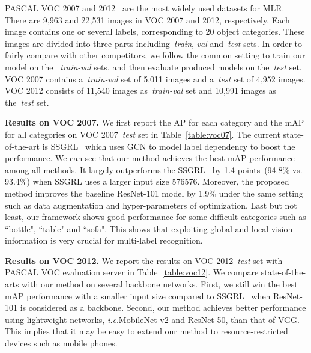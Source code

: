 \documentclass[journal]{IEEEtran}
\makeatletter
\DeclareRobustCommand\onedot{\@onedot}
\def\@onedot{.}
\def\ie{\emph{i.e}\onedot}
\makeatother
\begin{document}
PASCAL VOC 2007 and 2012~\cite{everingham2010pascal} are the most widely used datasets for MLR. There are 9,963 and 22,531 images in  VOC 2007 and 2012, respectively. Each image contains one or several labels, corresponding to 20 object categories. These images are divided into three parts including~\emph{train}, \emph{val} and~\emph{test} sets. In order to fairly compare with other competitors, we follow the common setting to train our model on the~
\emph{train-val} sets, and then evaluate produced models on the~\emph{test} set. VOC 2007 contains a~\emph{train-val} set of 5,011 images and a~\emph{test} set of 4,952 images. VOC 2012 consists of 11,540 images as~\emph{train-val} set and 10,991 images as the~\emph{test} set.

\noindent \textbf{Results on VOC 2007.}
We first report the AP for each category and the mAP for all categories on VOC 2007~\emph{test} set in Table~\ref{table:voc07}. The current state-of-the-art is SSGRL~\cite{chenlearning} which uses GCN to model label dependency to boost the performance. We can see that our method achieves the best mAP performance among all methods. 
It largely outperforms the SSGRL~\cite{chen2019multi} by 1.4 points~(94.8\% vs. 93.4\%) when SSGRL uses a larger input size 576576. 
Moreover, the proposed method improves the baseline ResNet-101 model by 1.9\% under the same setting such as data augmentation and hyper-parameters of optimization. Last but not least, our framework shows good performance for some difficult categories such as ``bottle", ``table" and ``sofa". This shows that exploiting global and local vision information is very crucial for multi-label recognition.

\noindent \textbf{Results on VOC 2012.}
We report the results on VOC 2012~\emph{test} set with PASCAL VOC evaluation server in Table~\ref{table:voc12}. We compare state-of-the-arts with our method on several backbone networks. First, we still win the best mAP performance with a smaller input size compared to SSGRL~\cite{chenlearning} when ResNet-101 is considered as a backbone. Second, our method achieves better performance using lightweight networks, \ie MobileNet-v2 and ResNet-50, than that of VGG. This implies that it may be easy to extend our method to resource-restricted devices such as mobile phones.
\end{document}
